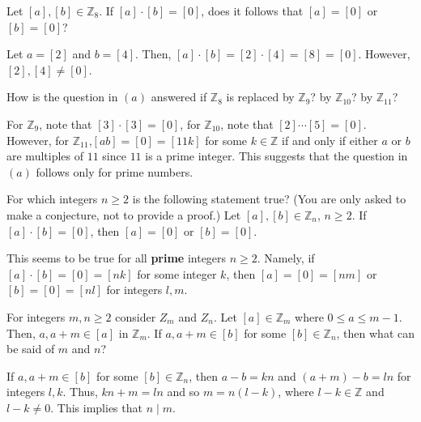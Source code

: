 \documentclass[12pt]{article}
\newcommand{\Z}{\mathbb{Z}}
\newenvironment{problem}[2][Problem]{\begin{trivlist} \item[\hskip \labelsep {\bfseries #1}\hskip \labelsep {\bfseries #2.}]}{\end{trivlist}}
\newenvironment{solution}[2][Solution]{\begin{trivlist} \item[\hskip \labelsep {\bfseries #1}\hskip \labelsep {\bfseries #2.}]}{\end{trivlist}}
\begin{document}
   \begin{problem}{59}
     \begin{enumerate}[label=(\alph*)]
       \item Let $[a],[b]\in\Z_{8}$. If $[a]\cdot[b]=[0]$, does it follows that $[a]=[0]$ or $[b]=[0]$?
	 \begin{solution}{(a)}
	   Let $a=[2]$ and $b=[4]$. Then, $[a]\cdot[b] = [2]\cdot[4]=[8]=[0]$. However, $[2],[4]\neq [0]$. 	  
       \end{solution}
       \item How is the question in $(a)$ answered if $\Z_{8}$ is replaced by $\Z_{9}$? by $\Z_{10}$? by $\Z_{11}$?
	 \begin{solution}{(b)}
	   For $\Z_{9}$, note that $[3]\cdot[3]=[0]$, for $\Z_{10}$, note that $[2]\cdots[5]=[0]$. However, for $\Z_{11}$,$[ab]=[0]=[11k]$ for some $k\in\Z$ if and only if either $a$ or $b$ are multiples of $11$ since $11$ is a prime integer. This suggests that the question in $(a)$ follows only for prime numbers.
	 \end{solution}
       \item For which integers $n\geq 2$ is the following statement true? (You are only asked to make a conjecture, not to provide a proof.) Let $[a],[b]\in \Z_{n}$, $n\geq2$. If $[a]\cdot[b]=[0]$, then $[a]=[0]$ or $[b]=[0]$.
	 \begin{solution}{(c)}
	   This seems to be true for all \textbf{prime} integers $n\geq 2$. Namely, if $[a]\cdot[b]=[0]=[nk]$ for some integer $k$, then $[a]=[0]=[nm]$ or $[b]=[0]=[nl]$ for integers $l,m$.
	 \end{solution}
     \end{enumerate}
   \end{problem}

   \begin{problem}{60}
     For integers $m,n\geq 2$ consider $Z_{m}$ and $Z_{n}$. Let $[a]\in\Z_{m}$ where $0\leq a\leq m-1$. Then, $a,a+m\in[a]$ in $\Z_{m}$. If $a,a+m\in[b]$ for some $[b]\in\Z_{n}$, then what can be said of $m$ and $n$?
     \begin{solution}{60}
       If $a,a+m\in [b]$ for some $[b]\in \Z_{n}$, then $a-b=kn$ and $(a+m)-b = ln$ for integers $l,k$. Thus, $kn + m =ln$ and so $m=n(l-k)$, where $l-k\in\Z$ and $l-k\neq0$. This implies that $n\mid m$. 
     \end{solution}
   \end{problem}
\end{document}
